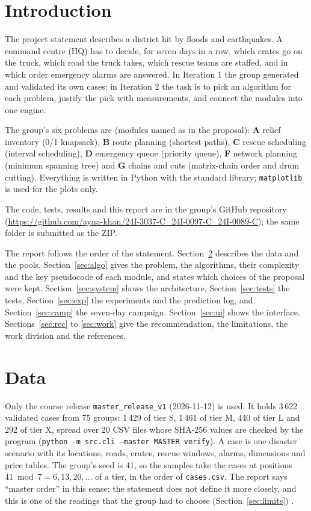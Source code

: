 \documentclass[11pt,a4paper]{article}
\newcommand{\cs}[1]{\texttt{#1}}
\begin{document}
\section{Introduction}
The project statement describes a district hit by floods and earthquakes. A command centre (HQ) has to decide, for seven days in a row, which crates go on the truck, which road the truck takes,
which rescue teams are staffed, and in which order emergency alarms are answered. In Iteration 1 the group generated and validated its own cases; in Iteration 2 the task
is to pick an algorithm for each problem, justify the pick with measurements, and connect the modules into one engine.

The group's six problems are (modules named as in the proposal): \textbf{A} relief inventory (0/1 knapsack), \textbf{B} route planning (shortest paths), \textbf{C} rescue scheduling (interval scheduling),
\textbf{D} emergency queue (priority queue), \textbf{F} network planning (minimum spanning tree) and \textbf{G} chains and cuts (matrix-chain order and drum cutting).
Everything is written in Python with the standard library; \cs{matplotlib} is used for the plots only.

The code, tests, results and this report are in the group's GitHub repository (\url{https://github.com/ayna-khan/24I-3037-C_24I-0097-C_24I-0089-C}); the same folder is submitted as the ZIP.

The report follows the order of the statement. Section~\ref{sec:data} describes the data and the pools. Section~\ref{sec:algo} gives the problem, the algorithms, their complexity and the key pseudocode
of each module, and states which choices of the proposal were kept. Section~\ref{sec:system} shows the architecture, Section~\ref{sec:tests} the tests, Section~\ref{sec:exp} the experiments and
the prediction log, and Section~\ref{sec:camp} the seven-day campaign. Section~\ref{sec:ui} shows the interface. Sections~\ref{sec:rec} to \ref{sec:work} give the recommendation, the limitations, the work division and the references.

\section{Data}\label{sec:data}
Only the course release \cs{master\_release\_v1} (2026-11-12) is used. It holds 3\,622 validated cases from 75 groups: 1\,429 of tier S, 1\,461 of tier M, 440 of tier L and 292 of tier X, spread over 20 CSV files
whose SHA-256 values are checked by the program (\cs{python -m src.cli --master MASTER verify}). A case is one disaster scenario with its locations, roads, crates, rescue windows, alarms, dimensions and price tables.
The group's seed is 41, so the samples take the cases at positions $41 \bmod 7 = 6, 13, 20,\dots$ of a tier, in the order of \cs{cases.csv}. The report says ``master order'' in this sense; the statement does not define it more closely, and this is one of the readings
that the group had to choose (Section~\ref{sec:limits}) \cite{stmt}.
\end{document}
